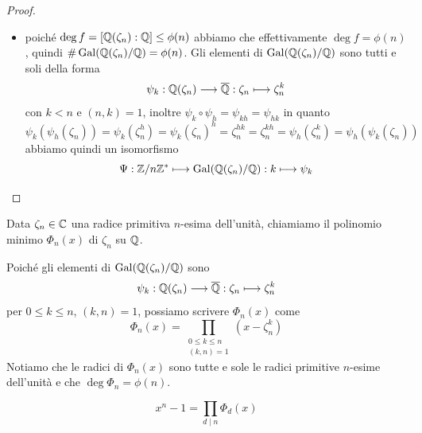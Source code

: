 \documentclass[11pt]{scrartcl}
\begin{document}
\begin{proof}
\begin{itemize}
			hanno lo stesso polinomio minimo su $\QQ$, quindi questo è valido 
			in generale per $\zeta_n$ e $\zeta_n^k$ con $(n, k) = 1$. In particolare
			$\zeta_n^k$ è radice di $f(x)$ per ogni $k < n$ con $(n, k) = 1$, pertanto 
			$\deg f \geq \phi(n)$;
			\item poiché $\deg f = [\mathbb Q(\zeta_n):\mathbb Q] \leq \phi(n)$ abbiamo che 
			effettivamente $\deg f = \phi(n)$, quindi $\#\operatorname{Gal}(\mathbb Q(\zeta_n)/\mathbb Q) = \phi(n)$.
			Gli elementi di $\operatorname{Gal}(\mathbb Q(\zeta_n)/\mathbb Q)$ sono tutti e soli della forma
			\[
			\psi_k: \mathbb Q(\zeta_n)\longrightarrow \overline{\mathbb Q}: \zeta_n \longmapsto \zeta_n^k
			\]
			con $k < n$ e $(n, k) = 1$, inoltre $\psi_k\circ\psi_h = \psi_{kh} = \psi_{hk}$
			in quanto 
			\[
			\psi_k(\psi_h(\zeta_n)) = \psi_k(\zeta_n^h) = \psi_k(\zeta_n)^h =
			\zeta_n^{hk} = \zeta_n^{kh} = \psi_h(\zeta_n^k) = \psi_h(\psi_k(\zeta_n))
			\]
			abbiamo quindi un isomorfismo 
			\[
			\Psi: {\mathbb Z}/n{\mathbb Z}^* \longmapsto \operatorname{Gal}(\mathbb Q(\zeta_n)/\mathbb Q):k \longmapsto \psi_k
			\]
		\end{itemize}
	\end{proof}
	
	\begin{definition}
		Data $\zeta_n \in \mathbb C$ una radice primitiva $n$-esima dell'unità, chiamiamo
		 il polinomio minimo $\Phi_n(x)$
		di $\zeta_n$ su $\QQ$.
	\end{definition}
	
	\begin{remark}
		Poiché gli elementi di $\operatorname{Gal}(\mathbb Q(\zeta_n)/\mathbb Q)$ sono
		\[
		\psi_k: \mathbb Q(\zeta_n) \longrightarrow \overline{\mathbb Q}: \zeta_n \longmapsto \zeta_n^k
		\]
		per $0 \leq k \leq n$, $(k, n) = 1$, possiamo scrivere $\Phi_n(x)$ come 
		\[
		\Phi_n(x) = \prod_{\substack{0\leq k \leq n\\(k, n) = 1}}(x - \zeta_n^k)
		\]
		Notiamo che le radici di $\Phi_n(x)$ sono tutte e sole le radici primitive
		$n$-esime dell'unità e che $\deg\Phi_n = \phi(n)$.
	\end{remark}
	
	\begin{proposition}
		\[
		x^n - 1 = \prod_{d\mid n}\Phi_d(x)
		\]
	\end{proposition}
	
\end{document}
